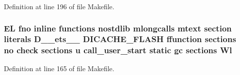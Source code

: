 Definition at line 196 of file Makefile.

\hypertarget{Makefile_afb1782b240d70229ae5bc6b111f9794a}{
\subsubsection[{Wl}]{\setlength{\rightskip}{0pt plus 5cm}E\-L fno inline functions nostdlib mlongcalls mtext section literals D\-\_\-\-\_\-ets\-\_\-\-\_\- D\-I\-C\-A\-C\-H\-E\-\_\-\-F\-L\-A\-S\-H ffunction sections no check sections u call\-\_\-user\-\_\-start static gc sections Wl}}\label{Makefile_afb1782b240d70229ae5bc6b111f9794a}


Definition at line 165 of file Makefile.

